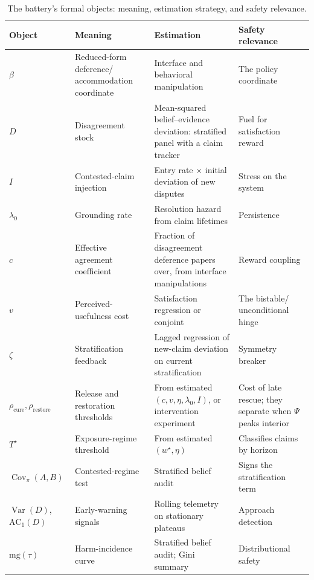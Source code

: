 \documentclass[11pt]{article}
\theoremstyle{definition}
\theoremstyle{remark}
\numberwithin{equation}{section}
\DeclareMathOperator{\Var}{Var}
\DeclareMathOperator{\Cov}{Cov}
\begin{document}
\begin{table}[t]
\centering\small
\begin{tabular}{>{\raggedright\arraybackslash}p{1.95cm}>{\raggedright\arraybackslash}p{3.9cm}>{\raggedright\arraybackslash}p{4.65cm}>{\raggedright\arraybackslash}p{3.0cm}}
\toprule
Object & Meaning & Estimation & Safety relevance \\
\midrule
$\beta$ & Reduced-form deference/ accommodation coordinate & Interface and behavioral manipulation & The policy coordinate \\
$D$ & Disagreement stock & Mean-squared belief--evidence deviation: stratified panel with a claim tracker & Fuel for satisfaction reward \\
$I$ & Contested-claim injection & Entry rate $\times$ initial deviation of new disputes & Stress on the system \\
$\lambda_0$ & Grounding rate & Resolution hazard from claim lifetimes & Persistence \\
$c$ & Effective agreement coefficient & Fraction of disagreement deference papers over, from interface manipulations & Reward coupling \\
$v$ & Perceived-usefulness cost & Satisfaction regression or conjoint & The bistable/ unconditional hinge \\
$\zeta$ & Stratification feedback & Lagged regression of new-claim deviation on current stratification & Symmetry breaker \\
$\rho_{\mathrm{cure}}, \rho_{\mathrm{restore}}$ & Release and restoration thresholds & From estimated $(c, v, \eta, \lambda_0, I)$, or intervention experiment & Cost of late rescue; they separate when $\Psi$ peaks interior \\
$T^\star$ & Exposure-regime threshold & From estimated $(w^\star, \eta)$ & Classifies claims by horizon \\
$\Cov_\pi(A,B)$ & Contested-regime test & Stratified belief audit & Signs the stratification term \\
$\Var(D)$, $\mathrm{AC}_1(D)$ & Early-warning signals & Rolling telemetry on stationary plateaus & Approach detection \\
$\mathrm{mg}(\tau)$ & Harm-incidence curve & Stratified belief audit; Gini summary & Distributional safety \\
\bottomrule
\end{tabular}
\caption{The battery's formal objects: meaning, estimation strategy, and safety relevance.}
\label{tab:objects}
\end{table}
\end{document}
